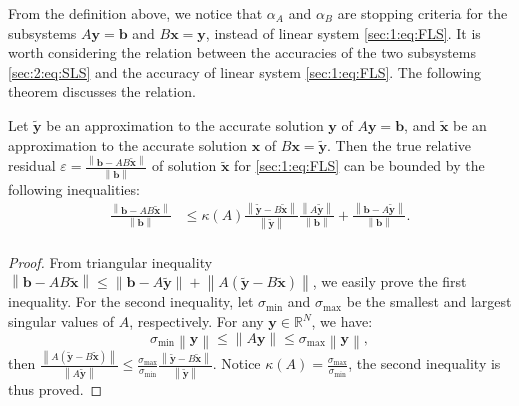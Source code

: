 \par
From the definition above, we notice that $\alpha_A$ and  $\alpha_B$ are stopping criteria for the subsystems $A\boldsymbol{y}=\boldsymbol{b}$ and $B\boldsymbol{x}=\boldsymbol{y}$, instead of linear system \eqref{sec:1:eq:FLS}. It is worth considering the relation between the accuracies of the two subsystems \eqref{sec:2:eq:SLS} and the accuracy of linear system \eqref{sec:1:eq:FLS}.
The following theorem discusses the relation.
\par
\begin{thm}\label{thm:main}
    Let $\tilde{\boldsymbol{y}}$ be an approximation to the accurate solution $\boldsymbol{y}$ of
    $A\boldsymbol{y}=\boldsymbol{b}$, and $\tilde{\boldsymbol{x}} $ be an approximation to the accurate solution $\boldsymbol{x}$ of $B\boldsymbol{x}=\tilde{\boldsymbol{y}}$. Then the true relative residual $\varepsilon = \frac{\left\|\boldsymbol{b}-AB
            \tilde{\boldsymbol{x}}\right\|}{\left\|\boldsymbol{b}\right\|}
$ of solution $\tilde{\boldsymbol{x}}$ for \eqref{sec:1:eq:FLS} can be bounded by the following inequalities:
    \begin{equation}\label{sec:2:eq:EA}
        \begin{aligned}
                    \frac{\left\|\boldsymbol{b}-AB \tilde{\boldsymbol{x}}\right\|}     
            {\left\|\boldsymbol{b}\right\|}
            &\leq 
            \kappa(A)\frac{\left\|\tilde{\boldsymbol{y}}-B
            \tilde{\boldsymbol{x}}\right\|}{\left\|\tilde{\boldsymbol{y}}\right\|}
            \frac{\left\|A\tilde{\boldsymbol{y}}\right\|}
            {\left\|\boldsymbol{b}\right\|}
            + \frac{\left\|\boldsymbol{b}-A
            \tilde{\boldsymbol{y}}\right\|}{\left\|\boldsymbol{b}\right\|}
            .\\
        \end{aligned}
    \end{equation}

\begin{proof}
    From triangular inequality $\left\|\boldsymbol{b}-AB\tilde{\boldsymbol{x}}\right\| \leq 
    \left\|\boldsymbol{b}-A\tilde{\boldsymbol{y}}\right\|+\left\|A(\tilde{\boldsymbol{y}}-B\tilde{\boldsymbol{x}})\right\|$, we easily prove the first inequality. For the second inequality, let $\sigma_{\min}$ and $\sigma_{\max}$ be the smallest and largest singular values of $A$, respectively. For any $\boldsymbol{y}\in \mathbb{R}^N$, we have:
    \[
    \sigma_{\min}\left\|\boldsymbol{y}\right\|\leq\left\|A\boldsymbol{y}\right\|
    \leq \sigma_{\max}\left\|\boldsymbol{y}\right\|
    ,\] 
    then $\frac{\left\|A(\tilde{\boldsymbol{y}}-
    B\tilde{\boldsymbol{x}})\right\|}{\left\|A\tilde{\boldsymbol{y}}\right\|}
    \leq \frac{\sigma_{\max}}{\sigma_{\min}}
    \frac{\left\|\tilde{\boldsymbol{y}}- B\tilde{\boldsymbol{x}}\right\|}
    {\left\|\tilde{\boldsymbol{y}}\right\|}.$ Notice $ \kappa(A) = 
    \frac{\sigma_{\max}}{\sigma_{\min}}
    $, the second inequality is thus proved.
\end{proof}
\end{thm}


